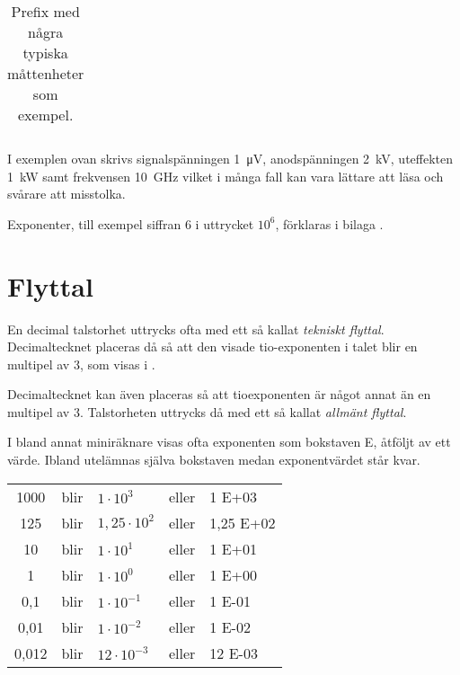 \begin{table*}[b]
\begin{center}
\begin{tabular}{|Sllll|}
      \hline
    \end{tabular}
  \end{center}
  \caption{Prefix med några typiska måttenheter som exempel.}
  \label{tab:prefix}
\end{table*}

I exemplen ovan skrivs signalspänningen \SI{1}{\micro\volt},
anodspänningen \SI{2}{\kilo\volt}, uteffekten \SI{1}{\kilo\watt} samt
frekvensen \SI{10}{\giga\hertz} vilket i många fall kan vara lättare
att läsa och svårare att misstolka.


Exponenter, till exempel siffran 6 i uttrycket \(10^6\), förklaras i
bilaga .


\section{Flyttal}

En decimal talstorhet uttrycks ofta med ett så kallat \emph{tekniskt
flyttal}.  Decimaltecknet placeras då så att den visade tio-exponenten
i talet blir en multipel av 3, som visas i .

Decimaltecknet kan även placeras så att tioexponenten är något annat
än en multipel av 3.  Talstorheten uttrycks då med ett så kallat
\emph{allmänt flyttal}.

I bland annat miniräknare visas ofta exponenten som bokstaven E,
åtföljt av ett värde.  Ibland utelämnas själva bokstaven medan
exponentvärdet står kvar.

\bigskip

\noindent\begin{tabular}{Sllll}
1000  & blir & \(1    \cdot 10^3  \) & eller & 1 E+03 \\
125   & blir & \(1,25 \cdot 10^2  \) & eller & 1,25 E+02 \\
10    & blir & \(1    \cdot 10^1  \) & eller & 1 E+01 \\
1     & blir & \(1    \cdot 10^0  \) & eller & 1 E+00 \\
0,1   & blir & \(1    \cdot 10^{-1}\) & eller & 1 E-01 \\
0,01  & blir & \(1    \cdot 10^{-2}\) & eller & 1 E-02 \\
0,012 & blir & \(12   \cdot 10^{-3}\) & eller & 12 E-03 \\
\end{tabular}


